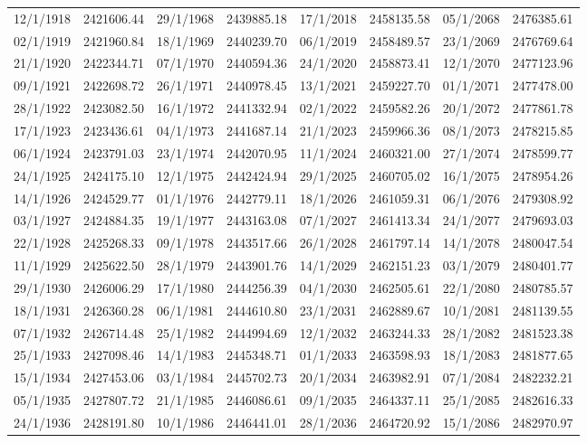 \begin{table}
{\begin{tabular}{cc|cc|cc|cc}
12/1/1918 & 2421606.44 & 29/1/1968 & 2439885.18 & 17/1/2018 & 2458135.58 & 05/1/2068 & 2476385.61\\
02/1/1919 & 2421960.84 & 18/1/1969 & 2440239.70 & 06/1/2019 & 2458489.57 & 23/1/2069 & 2476769.64\\
21/1/1920 & 2422344.71 & 07/1/1970 & 2440594.36 & 24/1/2020 & 2458873.41 & 12/1/2070 & 2477123.96\\
09/1/1921 & 2422698.72 & 26/1/1971 & 2440978.45 & 13/1/2021 & 2459227.70 & 01/1/2071 & 2477478.00\\
28/1/1922 & 2423082.50 & 16/1/1972 & 2441332.94 & 02/1/2022 & 2459582.26 & 20/1/2072 & 2477861.78\\
17/1/1923 & 2423436.61 & 04/1/1973 & 2441687.14 & 21/1/2023 & 2459966.36 & 08/1/2073 & 2478215.85\\
06/1/1924 & 2423791.03 & 23/1/1974 & 2442070.95 & 11/1/2024 & 2460321.00 & 27/1/2074 & 2478599.77\\
24/1/1925 & 2424175.10 & 12/1/1975 & 2442424.94 & 29/1/2025 & 2460705.02 & 16/1/2075 & 2478954.26\\
14/1/1926 & 2424529.77 & 01/1/1976 & 2442779.11 & 18/1/2026 & 2461059.31 & 06/1/2076 & 2479308.92\\
03/1/1927 & 2424884.35 & 19/1/1977 & 2443163.08 & 07/1/2027 & 2461413.34 & 24/1/2077 & 2479693.03\\
22/1/1928 & 2425268.33 & 09/1/1978 & 2443517.66 & 26/1/2028 & 2461797.14 & 14/1/2078 & 2480047.54\\
11/1/1929 & 2425622.50 & 28/1/1979 & 2443901.76 & 14/1/2029 & 2462151.23 & 03/1/2079 & 2480401.77\\
29/1/1930 & 2426006.29 & 17/1/1980 & 2444256.39 & 04/1/2030 & 2462505.61 & 22/1/2080 & 2480785.57\\
18/1/1931 & 2426360.28 & 06/1/1981 & 2444610.80 & 23/1/2031 & 2462889.67 & 10/1/2081 & 2481139.55\\
07/1/1932 & 2426714.48 & 25/1/1982 & 2444994.69 & 12/1/2032 & 2463244.33 & 28/1/2082 & 2481523.38\\
25/1/1933 & 2427098.46 & 14/1/1983 & 2445348.71 & 01/1/2033 & 2463598.93 & 18/1/2083 & 2481877.65\\
15/1/1934 & 2427453.06 & 03/1/1984 & 2445702.73 & 20/1/2034 & 2463982.91 & 07/1/2084 & 2482232.21\\
05/1/1935 & 2427807.72 & 21/1/1985 & 2446086.61 & 09/1/2035 & 2464337.11 & 25/1/2085 & 2482616.33\\
24/1/1936 & 2428191.80 & 10/1/1986 & 2446441.01 & 28/1/2036 & 2464720.92 & 15/1/2086 & 2482970.97\\

\end{tabular}}
\end{table}
